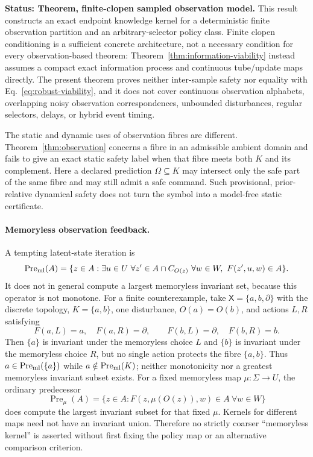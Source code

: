 \documentclass[11pt]{article}
\theoremstyle{definition}
\newcommand{\Pre}{\operatorname{Pre}}
\newcommand{\status}[1]{\par\smallskip\noindent\textbf{Status: #1.}\quad}
\begin{document}
\status{Theorem, finite-clopen sampled observation model} This result constructs an exact endpoint knowledge kernel for a deterministic finite observation partition and an arbitrary-selector policy class. Finite clopen conditioning is a sufficient concrete architecture, not a necessary condition for every observation-based theorem: Theorem~\ref{thm:information-viability} instead assumes a compact exact information process and continuous tube/update maps directly. The present theorem proves neither inter-sample safety nor equality with Eq.~\eqref{eq:robust-viability}, and it does not cover continuous observation alphabets, overlapping noisy observation correspondences, unbounded disturbances, regular selectors, delays, or hybrid event timing.

The static and dynamic uses of observation fibres are different. Theorem~\ref{thm:observation} concerns a fibre in an admissible ambient domain and fails to give an exact static safety label when that fibre meets both $K$ and its complement. Here a declared prediction $\Omega\subseteq K$ may intersect only the safe part of the same fibre and may still admit a safe command. Such provisional, prior-relative dynamical safety does not turn the symbol into a model-free static certificate.

\paragraph{Memoryless observation feedback.}
A tempting latent-state iteration is
\[
\Pre_{\rm ml}(A)=\{z\in A:\exists u\in U\ \forall z'\in A\cap C_{O(z)}\ \forall w\in W,\ F(z',u,w)\in A\}.
\]
It does not in general compute a largest memoryless invariant set, because this operator is not monotone. For a finite counterexample, take $\mathsf X=\{a,b,\partial\}$ with the discrete topology, $K=\{a,b\}$, one disturbance, $O(a)=O(b)$, and actions $L,R$ satisfying
\[
F(a,L)=a,\quad F(a,R)=\partial,\qquad
F(b,L)=\partial,\quad F(b,R)=b.
\]
Then $\{a\}$ is invariant under the memoryless choice $L$ and $\{b\}$ is invariant under the memoryless choice $R$, but no single action protects the fibre $\{a,b\}$. Thus $a\in\Pre_{\rm ml}(\{a\})$ while $a\notin\Pre_{\rm ml}(K)$; neither monotonicity nor a greatest memoryless invariant subset exists. For a fixed memoryless map $\mu:\Sigma\to U$, the ordinary predecessor
\[
\Pre_\mu(A)=\{z\in A:F(z,\mu(O(z)),w)\in A\ \forall w\in W\}
\]
does compute the largest invariant subset for that fixed $\mu$. Kernels for different maps need not have an invariant union. Therefore no strictly coarser ``memoryless kernel'' is asserted without first fixing the policy map or an alternative comparison criterion.
\end{document}
